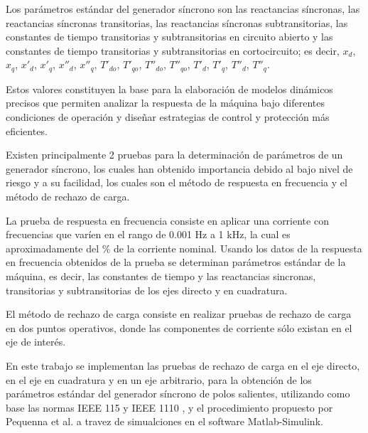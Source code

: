 \documentclass[conference]{IEEEtran}
\begin{document}
Los parámetros estándar del generador síncrono son las reactancias síncronas, las reactancias síncronas transitorias, las reactancias síncronas subtransitorias, las constantes de tiempo transitorias y subtransitorias en circuito abierto y las constantes de tiempo transitorias y subtransitorias en cortocircuito; es decir, $x_d$, $x_q$, $x'_d$, $x'_q$, $x''_d$, $x''_q$, $T'_{do}$, $T'_{qo}$, $T''_{do}$, $T''_{qo}$, $T'_{d}$, $T'_{q}$, $T''_{d}$, $T''_{q}$.

Estos valores constituyen la base para la elaboración de modelos dinámicos precisos que permiten analizar la respuesta de la máquina bajo diferentes condiciones de operación y diseñar estrategias de control y protección más eficientes.

Existen principalmente 2 pruebas para la determinación de parámetros de un generador síncrono, los cuales han obtenido importancia debido al bajo nivel de riesgo y a su facilidad, los cuales son el método de respuesta en frecuencia y el método de rechazo de carga.

La prueba de respuesta en frecuencia consiste en aplicar una corriente con frecuencias que varíen en el rango de 0.001 Hz a 1 kHz, la cual es aproximadamente del \% de la corriente nominal. Usando los datos de la respuesta en frecuencia obtenidos de la prueba se determinan parámetros estándar de la máquina, es decir, las constantes de tiempo y las reactancias sincronas, transitorias y subtransitorias de los ejes directo y en cuadratura.

El método de rechazo de carga consiste en realizar pruebas de rechazo de carga en dos puntos operativos, donde las componentes de corriente sólo existan en el eje de interés. %


En este trabajo se implementan las pruebas de rechazo de carga en el eje directo, en el eje en cuadratura y en un eje arbitrario, para la obtención de los parámetros estándar del generador síncrono de polos salientes, utilizando como base las normas IEEE 115 \cite{IEEE115} y IEEE 1110 \cite{IEEE1110}, y el procedimiento propuesto por Pequenna et al. \cite{pequena,Pequena2010} a travez de simualciones en el software Matlab-Simulink.
\end{document}
